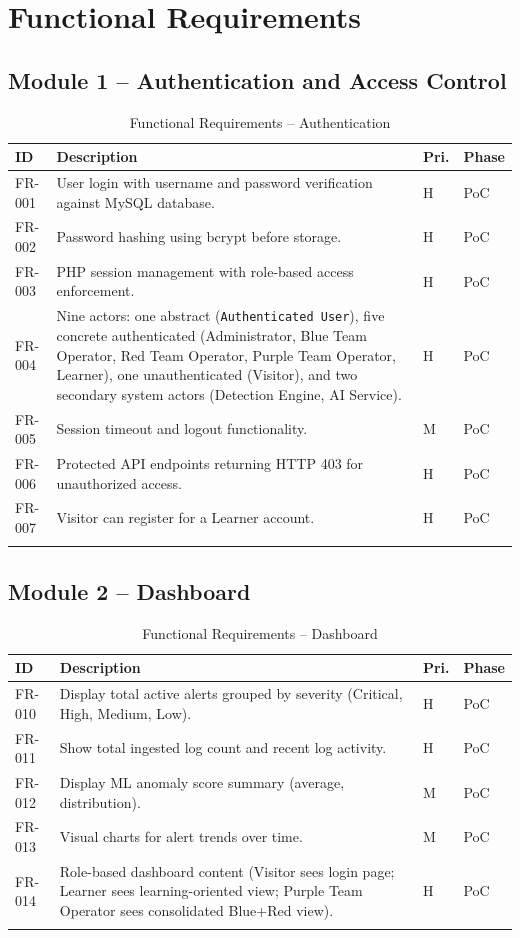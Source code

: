 \documentclass[12pt,a4paper]{report}
\begin{document}
	\section{Functional Requirements}
	
	\subsection{Module 1 -- Authentication and Access Control}
	\begin{longtable}{L{1.6cm} L{7.8cm} C{1.2cm} C{1.4cm}}
		\toprule
		\textbf{ID} & \textbf{Description} & \textbf{Pri.} & \textbf{Phase} \\
		\midrule
		FR-001 & User login with username and password verification against MySQL database. & H & PoC \\
		FR-002 & Password hashing using bcrypt before storage. & H & PoC \\
		FR-003 & PHP session management with role-based access enforcement. & H & PoC \\
		FR-004 & Nine actors: one abstract (\texttt{Authenticated User}), five concrete authenticated (Administrator, Blue Team Operator, Red Team Operator, Purple Team Operator, Learner), one unauthenticated (Visitor), and two secondary system actors (Detection Engine, AI Service). & H & PoC \\
		FR-005 & Session timeout and logout functionality. & M & PoC \\
		FR-006 & Protected API endpoints returning HTTP 403 for unauthorized access. & H & PoC \\
		FR-007 & Visitor can register for a Learner account. & H & PoC \\
		\bottomrule
		\caption{Functional Requirements -- Authentication}
	\end{longtable}
	
	\subsection{Module 2 -- Dashboard}
	\begin{longtable}{L{1.6cm} L{7.8cm} C{1.2cm} C{1.4cm}}
		\toprule
		\textbf{ID} & \textbf{Description} & \textbf{Pri.} & \textbf{Phase} \\
		\midrule
		FR-010 & Display total active alerts grouped by severity (Critical, High, Medium, Low). & H & PoC \\
		FR-011 & Show total ingested log count and recent log activity. & H & PoC \\
		FR-012 & Display ML anomaly score summary (average, distribution). & M & PoC \\
		FR-013 & Visual charts for alert trends over time. & M & PoC \\
		FR-014 & Role-based dashboard content (Visitor sees login page; Learner sees learning-oriented view; Purple Team Operator sees consolidated Blue+Red view). & H & PoC \\
		\bottomrule
		\caption{Functional Requirements -- Dashboard}
	\end{longtable}
	
\end{document}
